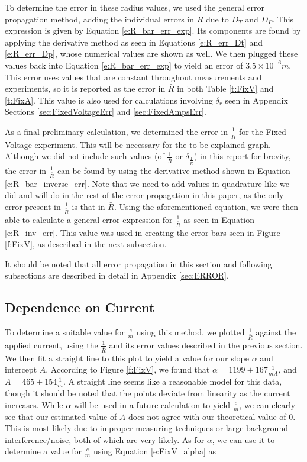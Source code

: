 \documentclass[12pt]{article}
\begin{document}
To determine the error in these radius values, we used the general error propagation method, adding the individual errors in $\bar{R}$ due to $D_T$ and $D_P$. This expression is given by Equation \ref{e:R_bar_err_exp}. Its components are found by applying the derivative method as seen in Equations \ref{e:R_err_Dt} and \ref{e:R_err_Dp}, whose numerical values are shown as well. We then plugged these values back into Equation \ref{e:R_bar_err_exp} to yield an error of $3.5\times10^{-6}m$. This error uses values that are constant throughout measurements and experiments, so it is reported as the error in $\bar{R}$ in both Table \ref{t:FixV} and \ref{t:FixA}. This value is also used for calculations involving $\delta_r$ seen in Appendix Sections \ref{sec:FixedVoltageErr} and \ref{sec:FixedAmpsErr}.

As a final preliminary calculation, we determined the error in $\frac{1}{\bar{R}}$ for the Fixed Voltage experiment. This will be necessary for the to-be-explained graph. Although we did not include such values (of $\frac{1}{\bar{R}}$ or $\delta_{\frac{1}{\bar{R}}}$) in this report for brevity, the error in $\frac{1}{\bar{R}}$ can be found by using the derivative method shown in Equation \ref{e:R_bar_inverse_err}. Note that we need to add values in quadrature like we did and will do in the rest of the error propagation in this paper, as the only error present in $\frac{1}{\bar{R}}$ is that in $\bar{R}$. Using the aforementioned equation, we were then able to calculate a general error expression for $\frac{1}{\bar{R}}$ as seen in Equation \ref{e:R_inv_err}. This value was used in creating the error bars seen in Figure \ref{f:FixV}, as described in the next subsection.

It should be noted that all error propagation in this section and following subsections are described in detail in Appendix \ref{sec:ERROR}.

\subsection{Dependence on Current}
To determine a suitable value for $\frac{e}{m}$ using this method, we plotted $\frac{1}{\bar{R}}$ against the applied current, using the $\frac{1}{\bar{R}}$ and its error values described in the previous section. We then fit a straight line to this plot to yield a value for our slope $\alpha$ and intercept $A$. According to Figure \ref{f:FixV}, we found that $\alpha=1199\pm167\frac{1}{mA}$, and $A=465\pm154\frac{1}{m}$. A straight line seems like a reasonable model for this data, though it should be noted that the points deviate from linearity as the current increases. While $\alpha$ will be used in a future calculation to yield $\frac{e}{m}$, we can clearly see that our estimated value of $A$ does not agree with our theoretical value of 0. This is most likely due to improper measuring techniques or large background interference/noise, both of which are very likely. As for $\alpha$, we can use it to determine a value for $\frac{e}{m}$ using Equation \ref{e:FixV_alpha} as
\end{document}
